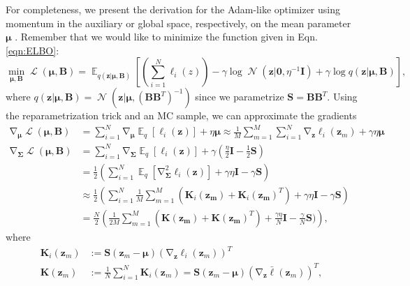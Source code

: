\documentclass[a4paper, 11pt, oneside]{scrartcl}
\theoremstyle{break}
\DeclareMathOperator{\Normal}{\mathcal{N}}
\DeclareMathOperator{\Expect}{\mathbb{E}}
\DeclareMathOperator{\grad}{\nabla}
\DeclareMathOperator{\ELBO}{\mathcal{L}}
\newcommand{\matr}[1]{\boldsymbol{#1}}
\numberwithin{equation}{section}
\begin{document}
				For completeness, we present the derivation for the Adam-like optimizer using momentum in the auxiliary or global space, respectively, on the mean parameter $\matr{\mu}$ \parencite[Sec. E.3]{LSK20}. 
				Remember that we would like to minimize the function given in Eqn. \ref{eqn:ELBO}:
				\begin{equation}
					\min_{\matr{\mu}, \matr{B}} \ELBO(\matr{\mu}, \matr{B}) = \Expect_{q(\matr{z} | \matr{\mu}, \matr{B})} \left[ \left( \sum_{i=1}^N \ell_i(z) \right) - \gamma \log \Normal(\matr{z} | \matr{0}, \eta^{-1} \matr{I}) + \gamma \log q(\matr{z} | \matr{\mu}, \matr{B})\right],
					\label{eqn:ELBO_Objective}
				\end{equation}
				where $q(\matr{z} | \matr{\mu}, \matr{B}) = \Normal(\matr{z} | \matr{\mu}, (\matr{B} \matr{B}^T)^{-1})$ since we parametrize $\matr{S} = \matr{B} \matr{B}^T$.
				Using the reparametrization trick and an MC sample, we can approximate the gradients
				\begin{align*}
					\grad_{\matr{\mu}} \ELBO(\matr{\mu}, \matr{B}) &= \sum_{i=1}^N \grad_{\matr{\mu}}\Expect_q[\ell_i (\matr{z})] + \eta \matr{\mu} \approx \frac{1}{M} \sum_{m=1}^M \sum_{i=1}^N \grad_{\matr{z}} \ell_i (\matr{z}_m) + \gamma \eta \matr{\mu} \\
					\grad_{\matr{\Sigma}} \ELBO(\matr{\mu}, \matr{B}) &= \sum_{i=1}^N \grad_{\matr{\Sigma}} \Expect_q[\ell_i (\matr{z})] + \gamma \left( \frac{\eta}{2} \matr{I} - \frac{1}{2} \matr{S} \right) \\
					&= \frac{1}{2} \left( \sum_{i=1}^N \Expect_q[\grad_{\matr{\Sigma}}^2 \ell_i (\matr{z})] + \gamma \eta \matr{I} - \gamma \matr{S} \right) \\
					&\approx \frac{1}{2} \left( \sum_{i=1}^N \frac{1}{M} \sum_{m=1}^M (\matr{K}_i(\matr{z_m}) + \matr{K}_i(\matr{z_m})^T) + \gamma \eta \matr{I} - \gamma \matr{S} \right) \\
					&= \frac{N}{2} \left( \frac{1}{2 M} \sum_{m=1}^M (\matr{K}(\matr{z_m}) + \matr{K}(\matr{z_m})^T) + \frac{\gamma \eta}{N} \matr{I} - \frac{\gamma}{N} \matr{S}) \right),
				\end{align*}
				where 
				\begin{align*}
					\matr{K}_i(\matr{z}_m) &:= \matr{S} (\matr{z}_m - \matr{\mu}) (\grad_{\matr{z}} \ell_i (\matr{z}_m) )^T \\
					\matr{K}(\matr{z}_m) &:= \frac{1}{N} \sum_{i=1}^N \matr{K}_i(\matr{z}_m) = \matr{S} (\matr{z}_m - \matr{\mu}) (\grad_{\matr{z}} \bar{\ell} (\matr{z}_m) )^T,
				\end{align*}
\end{document}
